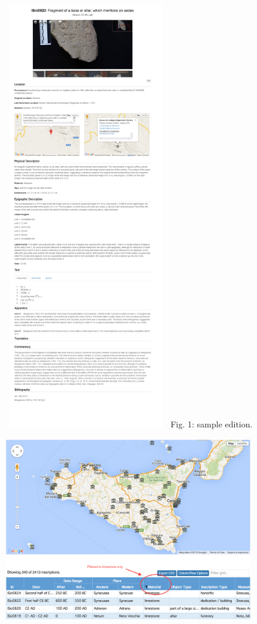 \documentclass[amsthm,ebook]{saparticle}
\begin{document}
 \includegraphics[width=7.197cm,height=18.653cm]{EAGLE2016ISicilyfinalcopy-img001.jpg} Fig. 1: sample edition.

 \includegraphics[width=10.881cm,height=7.966cm]{EAGLE2016ISicilyfinalcopy-img002.png} 
\end{document}
